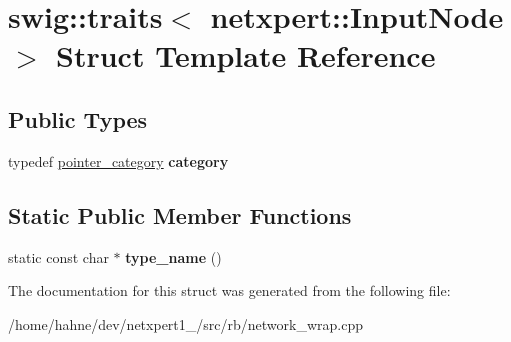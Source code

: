 \hypertarget{structswig_1_1traits_3_01netxpert_1_1InputNode_01_4}{}\section{swig\+:\+:traits$<$ netxpert\+:\+:Input\+Node $>$ Struct Template Reference}
\label{structswig_1_1traits_3_01netxpert_1_1InputNode_01_4}
\subsection*{Public Types}
\begin{DoxyCompactItemize}
\item 
typedef \hyperlink{structswig_1_1pointer__category}{pointer\+\_\+category} {\bfseries category}\hypertarget{structswig_1_1traits_3_01netxpert_1_1InputNode_01_4_ab3d1292adadda5ab2cc48668d312a616}{}\label{structswig_1_1traits_3_01netxpert_1_1InputNode_01_4_ab3d1292adadda5ab2cc48668d312a616}

\end{DoxyCompactItemize}
\subsection*{Static Public Member Functions}
\begin{DoxyCompactItemize}
\item 
static const char $\ast$ {\bfseries type\+\_\+name} ()\hypertarget{structswig_1_1traits_3_01netxpert_1_1InputNode_01_4_a44e240bd6fe0f9cc1a7c428e8e84accd}{}\label{structswig_1_1traits_3_01netxpert_1_1InputNode_01_4_a44e240bd6fe0f9cc1a7c428e8e84accd}

\end{DoxyCompactItemize}


The documentation for this struct was generated from the following file\+:\begin{DoxyCompactItemize}
\item 
/home/hahne/dev/netxpert1\+\_/src/rb/network\+\_\+wrap.\+cpp\end{DoxyCompactItemize}
